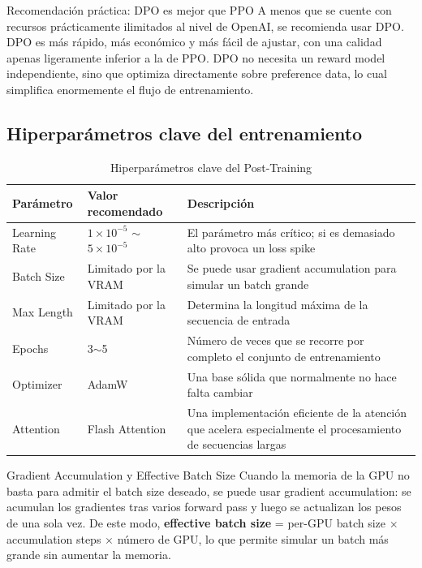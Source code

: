 \documentclass[a4paper]{article}
\begin{document}
\begin{importantbox}{Recomendación práctica: DPO es mejor que PPO}
A menos que se cuente con recursos prácticamente ilimitados al nivel de OpenAI, se recomienda usar DPO. DPO es más rápido, más económico y más fácil de ajustar, con una calidad apenas ligeramente inferior a la de PPO. DPO no necesita un reward model independiente, sino que optimiza directamente sobre preference data, lo cual simplifica enormemente el flujo de entrenamiento.
\end{importantbox}

\subsection{Hiperparámetros clave del entrenamiento}

\begin{table}[H]
\centering
\caption{Hiperparámetros clave del Post-Training}
\begin{tabular}{lll}
\toprule
\textbf{Parámetro} & \textbf{Valor recomendado} & \textbf{Descripción} \\
\midrule
Learning Rate & $1 \times 10^{-5}$ $\sim$ $5 \times 10^{-5}$ & El parámetro más crítico; si es demasiado alto provoca un loss spike \\
Batch Size & Limitado por la VRAM & Se puede usar gradient accumulation para simular un batch grande \\
Max Length & Limitado por la VRAM & Determina la longitud máxima de la secuencia de entrada \\
Epochs & 3$\sim$5 & Número de veces que se recorre por completo el conjunto de entrenamiento \\
Optimizer & AdamW & Una base sólida que normalmente no hace falta cambiar \\
Attention & Flash Attention & Una implementación eficiente de la atención que acelera especialmente el procesamiento de secuencias largas \\
\bottomrule
\end{tabular}
\end{table}

\begin{knowledgebox}{Gradient Accumulation y Effective Batch Size}
Cuando la memoria de la GPU no basta para admitir el batch size deseado, se puede usar gradient accumulation: se acumulan los gradientes tras varios forward pass y luego se actualizan los pesos de una sola vez. De este modo, \textbf{effective batch size} = per-GPU batch size $\times$ accumulation steps $\times$ número de GPU, lo que permite simular un batch más grande sin aumentar la memoria.
\end{knowledgebox}
\end{document}
